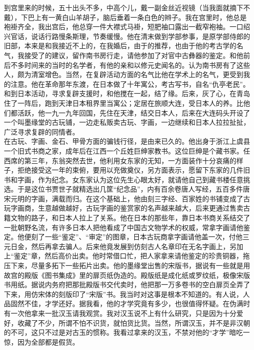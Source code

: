 到宫里来的时候，五十出头不多，中高个儿，戴一副金丝近视镜（当我面就摘下不戴），下巴上有一黄白山羊胡子，脑后垂着一条白色的辫子。我在宫里时，他总是袍褂齐全，我出宫后，他总穿一件大襟式马褂，短肥袖口露出一截窄袍袖。一口绍兴官话，说话行路慢条斯理，节奏缓慢。他在清末做到学部参事，是原学部侍郎的旧部，本来是和我接近不上的，在我婚后，由于的推荐，也由于他的考古学的名气，我接受了的建议，留作南书房行走，请他参加了对官中古彝器的鉴定。和他前后不多时间来的当时的名学者，有他的亲和以修元史闻名的。认为南书房有了这些人，颇为清室增色。当然，在复辟活动方面的名气比他在学术上的名气，更受到我的注意。他在革命那年东渡，在日本做了十年寓公，考古写书，自名“仇亭老民”。和到日本活动，寻求复辟支援时，和他搅在一起，结了缘。后来，灰了心，在青岛住了一阵后，跑到天津日本租界里当寓公；定居在旅顺大连，受日本人的养。比他们都活跃，他一九一九年回国，先住在天津，结交日本人，后来在大连码头开设了一个叫墨缘堂的古玩铺，一边走私贩卖古玩、字画，一边继续和日本人拉拉扯扯，广泛寻求复辟的同情者。\\

在古玩、字画、金石、甲骨方面的骗钱行径，是由来已久的。他出身于浙江上虞县一个旧式书商之家，成年后在江西一个丘姓巨绅家教书。这位巨绅是个藏书家。任西席的第三年，东翁突然去世，他利用女东家的无知，一方面装作十分哀痛的样子，拒绝接受这一年的束俯，要用以充做奠仪，另方面表示，愿留下东家的几件旧书和字画，作为纪念。女东家认为这位先生心眼太好，就请他自己到藏书楼任意挑选。于是这位书贾世子就精选出几筐“纪念品”，内有百余卷唐人写经，五百多件唐宋元明的字画，满载而归。在这个基础上，他由刻三字经、百家姓的书铺变成了古玩字画商，生意越做越好，古玩字画的鉴赏家的名声越来越大，后来更通过售卖古籍文物的路子，和日本人拉上了关系。他在日本的那些年，靠日本书商关系结交了一批朝野名流，有许多日本人把他看成了中国古文物学术的权威，常拿字画请他鉴定。他便刻了一些“鉴定”、“审定”的图章，日本古玩商拿字画请他盖一次，付他三元日金，然后再拿去骗人。后来他竟发展到仿刻古人名章印在无名字画上，另加上“鉴定”章，然后高价出卖。他时常借口忙，把人家拿来请他鉴定的珍贵铜器，拖压下来，尽量多拓下一些拓片出卖。他的墨缘堂出售的宋版书，据说有一些就是用故宫的殿版《图书集成》里的扉页纸伪造的。殿版纸是成化纸或罗纹纸，极像宋版书用纸。据说内务府把那批殿版书交代卖时，他把那一万多卷书的空白扉页全弄了下来，用仿宋体的刻版印了“宋版”书。我当时对这事是根本不知道的。有人说，人品固然不佳，才学还好。据我看，他的才学究竟有多少，也很值得怀疑。在伪满时有一次他拿来一批汉玉请我观赏。我对汉玉说不上有什么研究，只是因为十分爱好，收藏了不少，所谓不怕不识货，就怕货比货。当然，所谓汉玉，并不是非汉朝的不可，这只不过是对古玉的惯称。我看过拿来的汉玉，不禁对他的“才学”暗吃一惊，因为全部都是假货。\\

